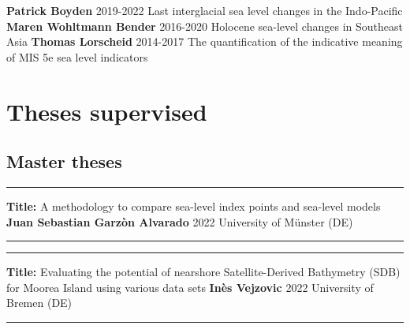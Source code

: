 \documentclass[%
               doublesided,
               paper=a4,
               fontsize=10pt
              ]{my-resume}
\begin{document}
{        \publication
	{} %
        {\textbf{Patrick Boyden}} %
	{2019-2022} %
	{Last interglacial sea level changes in the Indo-Pacific} %
	{} %
        \publication
	{} %
        {\textbf{Maren Wohltmann Bender}} %
	{2016-2020} %
	{Holocene sea-level changes in Southeast Asia} %
	{} %
         \publication
	{} %
        {\textbf{Thomas Lorscheid}} %
	{2014-2017} %
	{The quantification of the indicative meaning of MIS 5e sea level indicators} %
	{} %
	
	
}       
\makebody
\clearpage

\pagestyle{empty}
    \section[\faCompass]{Theses supervised}
\subsection{Master theses}

\setlength{\pubdatelength}{0.25 \linewidth}
\smallskip
\hrule
\smallskip
    \publication
	{\textbf{Title:} A methodology to compare sea-level index points and sea-level models} %
	{\textbf{Juan Sebastian Garzòn Alvarado}} %
	{2022} %
	{University of Münster (DE)} %
	{} %

\smallskip
\hrule

\hrule
\smallskip
    \publication
	{\textbf{Title:} Evaluating the potential of nearshore Satellite-Derived Bathymetry (SDB) for Moorea Island using various data sets} %
	{\textbf{Inès Vejzovic}} %
	{2022} %
	{University of Bremen (DE)} %
	{} %

\smallskip
\hrule
\smallskip
    
\end{document}
